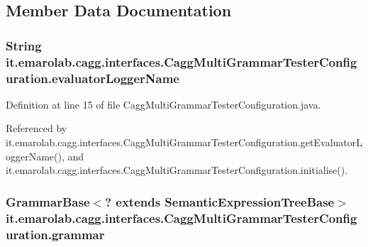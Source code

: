 \subsection{Member Data Documentation}
\hypertarget{classit_1_1emarolab_1_1cagg_1_1interfaces_1_1CaggMultiGrammarTesterConfiguration_ad95451345d9a7ec26774a89bffdc2502}{
\subsubsection[{evaluator\-Logger\-Name}]{\setlength{\rightskip}{0pt plus 5cm}String it.\-emarolab.\-cagg.\-interfaces.\-Cagg\-Multi\-Grammar\-Tester\-Configuration.\-evaluator\-Logger\-Name\hspace{0.3cm}{\ttfamily [private]}}}\label{classit_1_1emarolab_1_1cagg_1_1interfaces_1_1CaggMultiGrammarTesterConfiguration_ad95451345d9a7ec26774a89bffdc2502}


Definition at line 15 of file Cagg\-Multi\-Grammar\-Tester\-Configuration.\-java.



Referenced by it.\-emarolab.\-cagg.\-interfaces.\-Cagg\-Multi\-Grammar\-Tester\-Configuration.\-get\-Evaluator\-Logger\-Name(), and it.\-emarolab.\-cagg.\-interfaces.\-Cagg\-Multi\-Grammar\-Tester\-Configuration.\-initialise().

\hypertarget{classit_1_1emarolab_1_1cagg_1_1interfaces_1_1CaggMultiGrammarTesterConfiguration_a3deb04a2cc12d4df6830b0523e08dced}{
\subsubsection[{grammar}]{\setlength{\rightskip}{0pt plus 5cm}Grammar\-Base$<$? extends {\bf Semantic\-Expression\-Tree\-Base}$>$ it.\-emarolab.\-cagg.\-interfaces.\-Cagg\-Multi\-Grammar\-Tester\-Configuration.\-grammar\hspace{0.3cm}{\ttfamily [private]}}}\label{classit_1_1emarolab_1_1cagg_1_1interfaces_1_1CaggMultiGrammarTesterConfiguration_a3deb04a2cc12d4df6830b0523e08dced}


